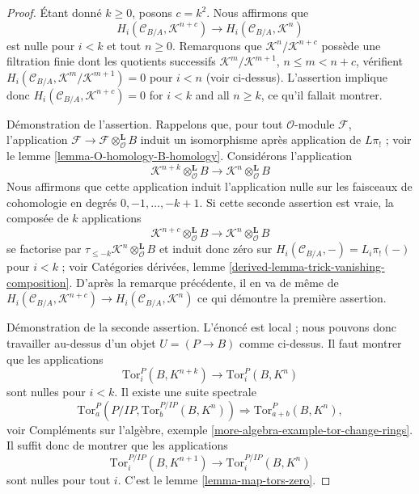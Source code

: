 \begin{proof}
\medskip\noindent
Étant donné $k \geq 0$, posons $c = k^2$. Nous affirmons que
$$
H_i(\mathcal{C}_{B/A}, \mathcal{K}^{n + c}) \to
H_i(\mathcal{C}_{B/A}, \mathcal{K}^n)
$$
est nulle pour $i < k$ et tout $n \geq 0$. Remarquons que
$\mathcal{K}^n/\mathcal{K}^{n + c}$ possède une filtration finie dont les
quotients successifs $\mathcal{K}^m/\mathcal{K}^{m + 1}$,
$n \leq m < n + c$, vérifient
$H_i(\mathcal{C}_{B/A}, \mathcal{K}^m/\mathcal{K}^{m + 1}) = 0$ pour $i < n$
(voir ci-dessus). L'assertion implique donc
$H_i(\mathcal{C}_{B/A}, \mathcal{K}^{n + c}) = 0$ for $i < k$ and all
$n \geq k$, ce qu'il fallait montrer.

\medskip\noindent
Démonstration de l'assertion. Rappelons que, pour tout $\mathcal{O}$-module
$\mathcal{F}$, l'application
$\mathcal{F} \to \mathcal{F} \otimes_\mathcal{O}^\mathbf{L} B$ induit un
isomorphisme après application de $L\pi_!$ ; voir le lemme
\ref{lemma-O-homology-B-homology}. Considérons l'application
$$
\mathcal{K}^{n + k} \otimes_\mathcal{O}^\mathbf{L} B
\longrightarrow
\mathcal{K}^n \otimes_\mathcal{O}^\mathbf{L} B
$$
Nous affirmons que cette application induit l'application nulle sur les
faisceaux de cohomologie en degrés $0, -1, \ldots, - k + 1$. Si cette seconde
assertion est vraie, la composée de $k$ applications
$$
\mathcal{K}^{n + c} \otimes_\mathcal{O}^\mathbf{L} B
\longrightarrow
\mathcal{K}^n \otimes_\mathcal{O}^\mathbf{L} B
$$
se factorise par
$\tau_{\leq -k}\mathcal{K}^n \otimes_\mathcal{O}^\mathbf{L} B$ et induit donc
zéro sur $H_i(\mathcal{C}_{B/A}, -) = L_i\pi_!( - )$ pour $i < k$ ; voir
Catégories dérivées, lemme
\ref{derived-lemma-trick-vanishing-composition}. D'après la remarque
précédente, il en va de même de
$H_i(\mathcal{C}_{B/A}, \mathcal{K}^{n + c}) \to
H_i(\mathcal{C}_{B/A}, \mathcal{K}^n)$
ce qui démontre la première assertion.

\medskip\noindent
Démonstration de la seconde assertion. L'énoncé est local ; nous pouvons donc
travailler au-dessus d'un objet $U = (P \to B)$ comme ci-dessus. Il faut
montrer que les applications
$$
\text{Tor}_i^P(B, K^{n + k}) \to \text{Tor}_i^P(B, K^n)
$$
sont nulles pour $i < k$. Il existe une suite spectrale
$$
\text{Tor}_a^P(P/IP, \text{Tor}_b^{P/IP}(B, K^n))
\Rightarrow
\text{Tor}_{a + b}^P(B, K^n),
$$
voir Compléments sur l'algèbre, exemple
\ref{more-algebra-example-tor-change-rings}. Il suffit donc de montrer que les
applications
$$
\text{Tor}_i^{P/IP}(B, K^{n + 1}) \to \text{Tor}_i^{P/IP}(B, K^n)
$$
sont nulles pour tout $i$. C'est le lemme \ref{lemma-map-tors-zero}.
\end{proof}

